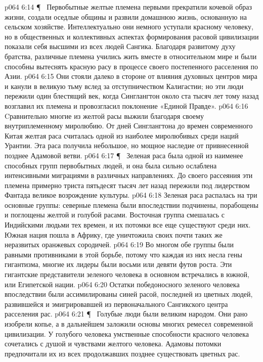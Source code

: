 \vs p064 6:14 \P\ \bibnobreakspace {} Первобытные желтые племена первыми прекратили кочевой образ жизни, создали оседлые общины и развили домашнюю жизнь, основанную на сельском хозяйстве. Интеллектуально они немного уступали красному человеку, но в общественных и коллективных аспектах формирования расовой цивилизации показали себя высшими из всех людей Сангика. Благодаря развитому духу братства, различные племена учились жить вместе в относительном мире и были способны вытеснять красную расу в процессе своего постепенного расселения по Азии.
\vs p064 6:15 Они стояли далеко в стороне от влияния духовных центров мира и канули в великую тьму вслед за отступничеством Калигастии; но эти люди пережили один блестящий век, когда Синглангтон около ста тысяч лет тому назад возглавил их племена и провозгласил поклонение «Единой Правде».
\vs p064 6:16 Cравнительно многие из желтой расы выжили благодаря своему внутриплеменному миролюбию. От дней Синглангтона до времен современного Китая желтая раса считалась одной из наиболее миролюбивых среди наций Урантии. Эта раса получила небольшое, но мощное наследие от привнесенной позднее Адамовой ветви.
\vs p064 6:17 \P\ \bibnobreakspace {} Зеленая раса была одной из наименее способных групп первобытных людей, и она была сильно ослаблена интенсивными миграциями в различных направлениях. До своего рассеяния эти племена примерно триста пятьдесят тысяч лет назад пережили под лидерством Фантада великое возрождение культуры.
\vs p064 6:18 Зеленая раса распалась на три основные группы: северные племена были впоследствии подчинены, порабощены и поглощены желтой и голубой расами. Восточная группа смешалась с Индийскими людьми тех времен, и их потомки все еще существуют среди них. Южная нация пошла в Африку, где уничтожила своих почти таких же неразвитых оранжевых сородичей.
\vs p064 6:19 Во многом обе группы были равными противниками в этой борьбе, потому что каждая из них несла гены гигантизма, многие их лидеры были восьми или девяти футов роста. Эти гигантские представители зеленого человека в основном встречались в южной, или Египетской нации.
\vs p064 6:20 Остатки победоносного зеленого человека впоследствии были ассимилированы синей расой, последней из цветных людей, развившейся и эмигрировавшей из первоначального Сангикского центра расселения рас.
\vs p064 6:21 \P\ \bibnobreakspace {} Голубые люди были великим народом. Они рано изобрели копье, а в дальнейшем заложили основы многих ремесел современной цивилизации. У голубого человека умственные способности красного человека сочетались с душой и чувствами желтого человека. Адамовы потомки предпочитали их из всех продолжавших позднее существовать цветных рас.
